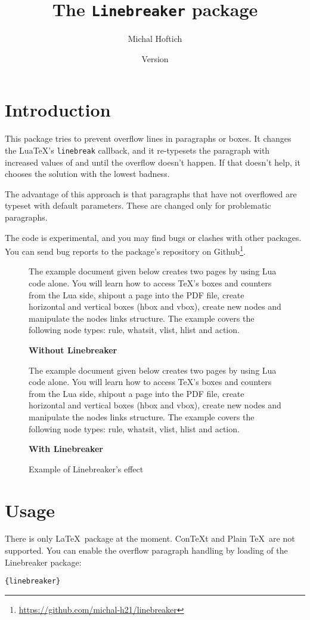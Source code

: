 \documentclass{l3doc}
\title{The \texttt{Linebreaker} package}
\author{Michal Hoftich\authormail{michal.h21@gmail.com}}
\date{Version \version\\\gitdate}
\newcommand\testbox[1]{%
  \parbox{150pt}{%
    \parindent=15pt%
    \tolerance=1%
    \pretolerance=1%
    #1
  }%
}
\newcommand\printtest[1]{%
  \linebreakerdisable%
  \noindent\testbox{%
    #1
    \par\medskip\noindent\hfill\textbf{Without Linebreaker}\hfill\null
  }%
  \linebreakerenable%
  \hfill%
  \testbox{%
    #1
    \par\medskip\noindent\hfill\textbf{With Linebreaker}\hfill\null
  }%
}
\begin{document}
\maketitle
\tableofcontents

\section{Introduction}

This package tries to prevent overflow lines in paragraphs or boxes.
It changes the Lua\TeX's \verb|linebreak| callback, and it re-typesets the paragraph 
with increased values of \cmd{\tolerance} and \cmd{\emergencystretch}
until the overflow doesn't happen. If that doesn't help, it chooses the solution
with the lowest badness.


The advantage of this approach is that paragraphs that have not overflowed are
typeset with default parameters. These are changed only for problematic
paragraphs.

The code is experimental, and you may find bugs or clashes with
other packages. You can send bug reports to the package's repository on 
Github\footnote{\url{https://github.com/michal-h21/linebreaker}}.



 \def\testtext{%
The example document given below creates two pages by using Lua code alone. You
will learn how to access TeX's boxes and counters from the Lua side, shipout a
page into the PDF file, create horizontal and vertical boxes (hbox and vbox),
create new nodes and manipulate the nodes links structure. The example covers
the following node types: rule, whatsit, vlist, hlist and action.
 }



\begin{figure}
\printtest\testtext%
\caption{Example of Linebreaker's effect}
\end{figure}

\newpage
\section{Usage}

There is only \LaTeX\ package at the moment. Con\TeX t and Plain \TeX\ are not supported.
You can enable the overflow paragraph handling by loading of the Linebreaker package:

\begin{center}
\cmd{\usepackage}\verb|{linebreaker}|
\end{center}
\end{document}

